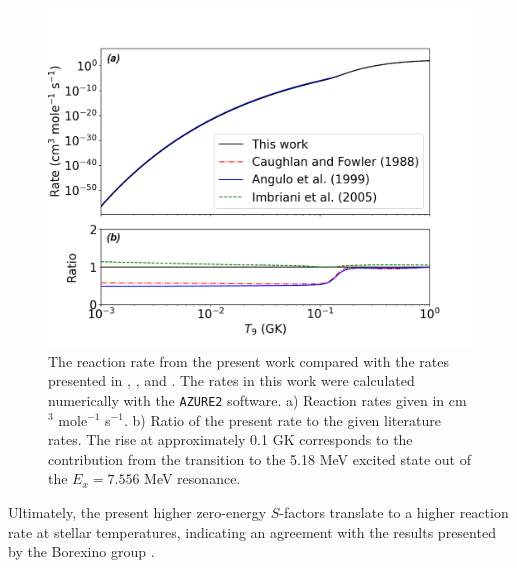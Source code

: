 \begin{figure}[htbp]
\centering
\includegraphics[width=1.0\columnwidth]{./figures/rr_with_518_zoom.png}
\caption{The reaction rate from the present work compared with the rates presented in \citet{Caughlan1988}, \citet{Angulo1999}, and \citet{Imbriani2005}. The rates in this work were calculated numerically with the \texttt{AZURE2} software. a) Reaction rates given in cm$^{3}$ mole$^{-1}$ s$^{-1}$. b) Ratio of the present rate to the given literature rates. The rise at approximately 0.1 GK corresponds to the contribution from the transition to the 5.18 MeV excited state out of the $E_{x}= 7.556$ MeV resonance. }
\label{fig: rrate_comp}
\end{figure}

Ultimately, the present higher zero-energy $S$-factors translate to a higher reaction rate at stellar temperatures, indicating an agreement with the results presented by the Borexino group \cite{agostini2020direct}.


%
% 
% 
